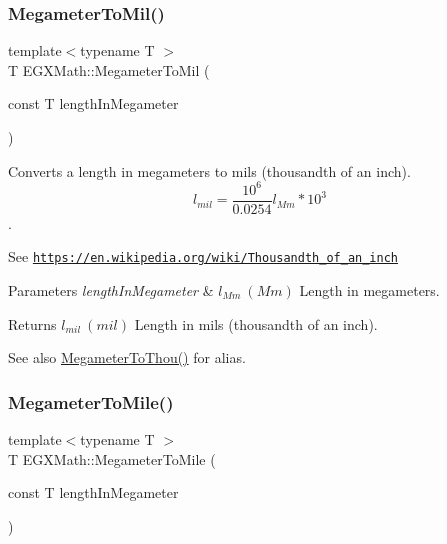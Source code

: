 \subsubsection{\texorpdfstring{Megameter\+To\+Mil()}{MegameterToMil()}}
{\footnotesize\ttfamily template$<$typename T $>$ \\
T E\+G\+X\+Math\+::\+Megameter\+To\+Mil (\begin{DoxyParamCaption}\item[{const T}]{length\+In\+Megameter }\end{DoxyParamCaption})}



Converts a length in megameters to mils (thousandth of an inch). \[ l_{mil}= \frac{10^{6}}{0.0254} l_{Mm} * 10^{3} \]. 

See \href{https://en.wikipedia.org/wiki/Thousandth_of_an_inch}{\tt https\+://en.\+wikipedia.\+org/wiki/\+Thousandth\+\_\+of\+\_\+an\+\_\+inch} 
\begin{DoxyParams}{Parameters}
{\em length\+In\+Megameter} & $ l_{Mm}\ (Mm)$ Length in megameters. \\
\hline
\end{DoxyParams}
\begin{DoxyReturn}{Returns}
$ l_{mil}\ (mil)$ Length in mils (thousandth of an inch). 
\end{DoxyReturn}
\begin{DoxySeeAlso}{See also}
\mbox{\hyperlink{group___e_g_x_math-_conversions-_length_conversions-_s_i-_megameter-_imperial_gae791a30b052a322fff88090e90fe32b5}{Megameter\+To\+Thou()}} for alias. 
\end{DoxySeeAlso}
\mbox{\label{group___e_g_x_math-_conversions-_length_conversions-_s_i-_megameter-_imperial_gaa20a079fd7502961010c93e0091ab17c}} 
\subsubsection{\texorpdfstring{Megameter\+To\+Mile()}{MegameterToMile()}}
{\footnotesize\ttfamily template$<$typename T $>$ \\
T E\+G\+X\+Math\+::\+Megameter\+To\+Mile (\begin{DoxyParamCaption}\item[{const T}]{length\+In\+Megameter }\end{DoxyParamCaption})}



